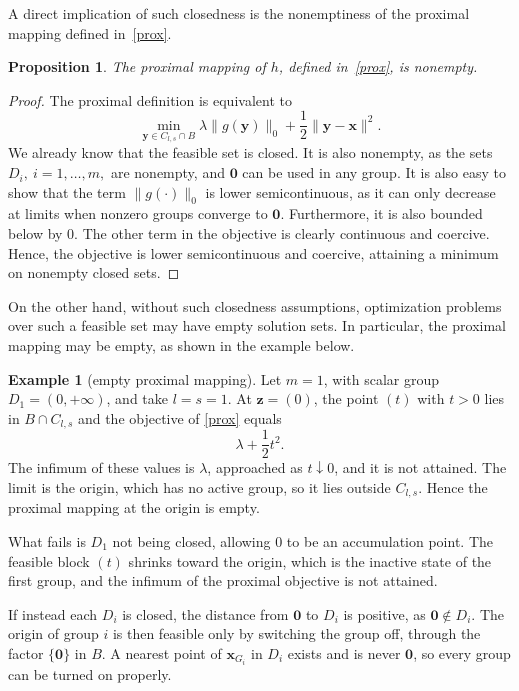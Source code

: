 \documentclass[11pt,a4paper]{article}
\theoremstyle{plain}
\newtheorem{proposition}{Proposition}
\theoremstyle{definition}
\newtheorem{example}{Example}
\theoremstyle{remark}
\newcommand*{\vz}{\mathbf{0}}
\newcommand*\x{\mathbf{x}}
\newcommand*\y{\mathbf{y}}
\newcommand*\z{\mathbf{z}}
\begin{document}
A direct implication of such closedness is the nonemptiness of the proximal mapping defined in~\eqref{prox}.
\begin{proposition}
  \label{prop:nonemptyprox}
  The proximal mapping of $h$, defined in~\eqref{prox}, is nonempty.
\end{proposition}
\begin{proof}
  The proximal definition is equivalent to \[ \min_{\y \in C_{l, s} \cap B} \lambda \| g(\y) \|_0 + \frac{1}{2} \| \y - \x \|^2.
  \]
  We already know that the feasible set is closed.
  It is also nonempty, as the sets \(D_i,\ i = 1, \ldots, m,\) are nonempty, and $\vz$ can be used in any group.
  It is also easy to show that the term $\| g(\cdot) \|_0$ is lower semicontinuous, as it can only decrease at limits when nonzero groups converge to \( \vz \).
  Furthermore, it is also bounded below by 0.
  The other term in the objective is clearly continuous and coercive.
  Hence, the objective is lower semicontinuous and coercive, attaining a minimum on nonempty closed sets.
\end{proof}

On the other hand, without such closedness assumptions, optimization problems over such a feasible set may have empty solution sets.
In particular, the proximal mapping may be empty, as shown in the example below.

\begin{example}[empty proximal mapping]
  \label{ex:counter}
  Let \(m=1\), with scalar group \(D_1=(0,+\infty)\), and take \(l=s=1\).
  At \(\z=(0)\), the point \((t)\) with \(t>0\) lies in \(B\cap C_{l,s}\) and the objective of \eqref{prox} equals \[ \lambda+\frac12 t^2.
  \]
  The infimum of these values is \(\lambda\), approached as \(t\downarrow 0\), and
  it is not attained.
  The limit is the origin, which has no active group, so it lies outside \(C_{l,s}\).
  Hence the proximal mapping at the origin is empty.
\end{example}

What fails is \( D_1 \) not being closed, allowing \( 0 \) to be an accumulation point.
The feasible block \((t)\) shrinks toward the origin, which is the inactive state of the first group, and the infimum of the proximal objective is not attained.

If instead each \(D_i\) is closed, the distance from \(\vz\) to \(D_i\) is positive, as \( \vz \not\in D_i \).
The origin of group \(i\) is then feasible only by switching the group off, through the factor \(\{\vz\}\) in \(B\).
A nearest point of \(\x_{G_i}\) in \(D_i\) exists and is never \(\vz\), so every group can be turned on properly.
\end{document}
